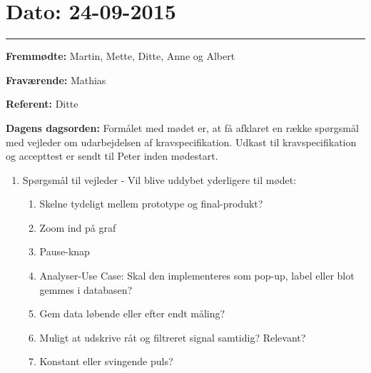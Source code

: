 \section{Dato: 24-09-2015}
\hrule

\textbf{Fremmødte:} Martin, Mette, Ditte, Anne og Albert

\textbf{Fraværende:} Mathias

\textbf{Referent:} Ditte

\textbf{Dagens dagsorden:}
\newline
Formålet med mødet er, at få afklaret en række spørgsmål med vejleder om udarbejdelsen af kravspecifikation.
Udkast til kravspecifikation og accepttest er sendt til Peter inden mødestart.
\begin{enumerate}
\item Spørgsmål til vejleder - Vil blive uddybet yderligere til mødet:
\begin{enumerate}
\item Skelne tydeligt mellem prototype og final-produkt?
\item Zoom ind på graf
\item Pause-knap
\item Analyser-Use Case: Skal den implementeres som pop-up, label eller blot gemmes i databasen?
\item Gem data løbende eller efter endt måling?
\item Muligt at udskrive råt og filtreret signal samtidig? Relevant?
\item Konstant eller svingende puls?
\end{enumerate}
\end{enumerate}


